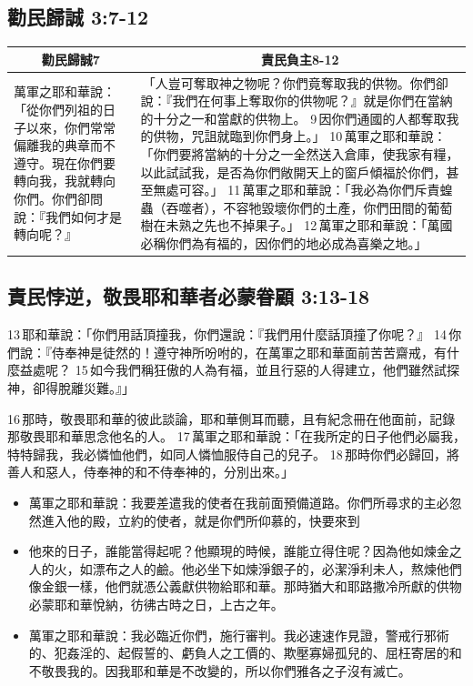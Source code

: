 \subsection{勸民歸誠 3:7-12}
\begin{table}[H]
\centering
\begin{tabular}{p{10.75cm}|p{6.50cm}}\hline\hline
\multicolumn{1}{c|}{勸民歸誠7}&\multicolumn{1}{c}{責民負主8-12}\\\hline
萬軍之耶和華說：「從你們列祖的日子以來，你們常常偏離我的典章而不遵守。現在你們要轉向我，我就轉向你們。你們卻問說：『我們如何才是轉向呢？』
& 「人豈可奪取神之物呢？你們竟奪取我的供物。你們卻說：『我們在何事上奪取你的供物呢？』就是你們在當納的十分之一和當獻的供物上。 9 因你們通國的人都奪取我的供物，咒詛就臨到你們身上。」 10 萬軍之耶和華說：「你們要將當納的十分之一全然送入倉庫，使我家有糧，以此試試我，是否為你們敞開天上的窗戶傾福於你們，甚至無處可容。」 11 萬軍之耶和華說：「我必為你們斥責蝗蟲（吞噬者），不容牠毀壞你們的土產，你們田間的葡萄樹在未熟之先也不掉果子。」 12 萬軍之耶和華說：「萬國必稱你們為有福的，因你們的地必成為喜樂之地。」\\\hline
\end{tabular}
\end{table}

\subsection{責民悖逆，敬畏耶和華者必蒙眷顧 3:13-18}

13 耶和華說：「你們用話頂撞我，你們還說：『我們用什麼話頂撞了你呢？』 14 你們說：『侍奉神是徒然的！遵守神所吩咐的，在萬軍之耶和華面前苦苦齋戒，有什麼益處呢？ 15 如今我們稱狂傲的人為有福，並且行惡的人得建立，他們雖然試探神，卻得脫離災難。』」

16 那時，敬畏耶和華的彼此談論，耶和華側耳而聽，且有紀念冊在他面前，記錄那敬畏耶和華思念他名的人。 17 萬軍之耶和華說：「在我所定的日子他們必屬我，特特歸我，我必憐恤他們，如同人憐恤服侍自己的兒子。 18 那時你們必歸回，將善人和惡人，侍奉神的和不侍奉神的，分別出來。」

\begin{itemize} 
\itemsep-.35em 
\item 萬軍之耶和華說：我要差遣我的使者在我前面預備道路。你們所尋求的主必忽然進入他的殿，立約的使者，就是你們所仰慕的，快要來到
\item 他來的日子，誰能當得起呢？他顯現的時候，誰能立得住呢？因為他如煉金之人的火，如漂布之人的鹼。他必坐下如煉淨銀子的，必潔淨利未人，熬煉他們像金銀一樣，他們就憑公義獻供物給耶和華。那時猶大和耶路撒冷所獻的供物必蒙耶和華悅納，彷彿古時之日，上古之年。
\item 萬軍之耶和華說：我必臨近你們，施行審判。我必速速作見證，警戒行邪術的、犯姦淫的、起假誓的、虧負人之工價的、欺壓寡婦孤兒的、屈枉寄居的和不敬畏我的。因我耶和華是不改變的，所以你們雅各之子沒有滅亡。
\end{itemize}


